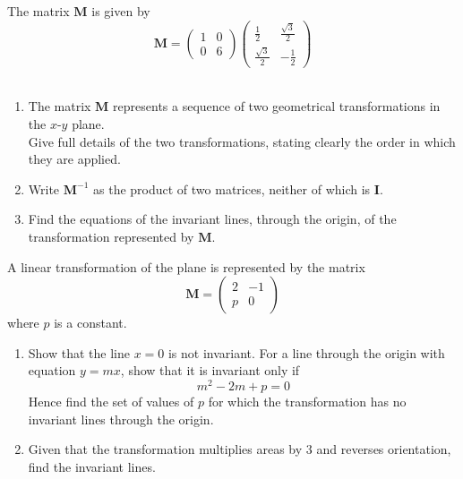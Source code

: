 \documentclass[leqno]{article}
\begin{document}
\begin{enumerate}[
  label=\textbf{\arabic*.},
  leftmargin=*,
  topsep=0pt,
  partopsep=0pt,
  parsep=0pt
]
The matrix $\mathbf{M}$ is given by
\[
\mathbf{M} = \begin{pmatrix} 1 & 0 \\[6pt] 0 & 6 \end{pmatrix}\begin{pmatrix} \frac{1}{2} & \frac{\sqrt{3}}{2} \\[6pt] \frac{\sqrt{3}}{2} & -\frac{1}{2} \end{pmatrix}
\] \\
\begin{enumerate}[label=\textbf{(\alph*)}]
  \item The matrix $\mathbf{M}$ represents a sequence of two geometrical transformations in the $x$-$y$ plane. \\
  Give full details of the two transformations, stating clearly the order in which they are applied.  \\
  \item Write $\mathbf{M}^{-1}$ as the product of two matrices, neither of which is $\mathbf{I}$.  \\
  \item Find the equations of the invariant lines, through the origin, of the transformation represented by $\mathbf{M}$.  \\
\end{enumerate}

\newpage

\questionitem

A linear transformation of the plane is represented by the matrix
\[
\mathbf{M}=\begin{pmatrix}2 & -1\\ p & 0\end{pmatrix}
\]
where $p$ is a constant. \\
\begin{enumerate}[label=\textbf{(\alph*)}]
  \item Show that the line $x=0$ is not invariant. For a line through the origin with equation $y=mx$, show that it is invariant only if
  \[
  m^2-2m+p=0
  \]
  Hence find the set of values of $p$ for which the transformation has no invariant lines through the origin. \\
  \item Given that the transformation multiplies areas by $3$ and reverses orientation, find the invariant lines.  \\
\end{enumerate}


\end{enumerate}
\end{document}
